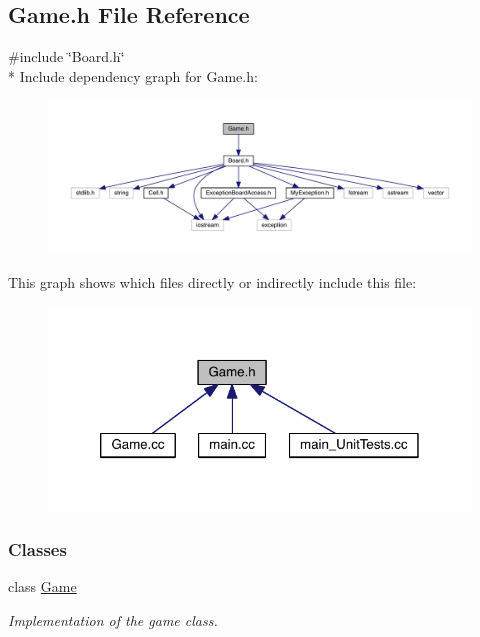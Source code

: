 \hypertarget{a00106}{}\subsection{Game.\+h File Reference}
\label{a00106}
{\ttfamily \#include \char`\"{}Board.\+h\char`\"{}}\\*
Include dependency graph for Game.\+h\+:\nopagebreak
\begin{figure}[H]
\begin{center}
\leavevmode
\includegraphics[width=350pt]{a00141}
\end{center}
\end{figure}
This graph shows which files directly or indirectly include this file\+:\nopagebreak
\begin{figure}[H]
\begin{center}
\leavevmode
\includegraphics[width=320pt]{a00142}
\end{center}
\end{figure}
\subsubsection*{Classes}
\begin{DoxyCompactItemize}
\item 
class \hyperlink{a00030}{Game}
\begin{DoxyCompactList}\small\item\em Implementation of the game class. \end{DoxyCompactList}\end{DoxyCompactItemize}
